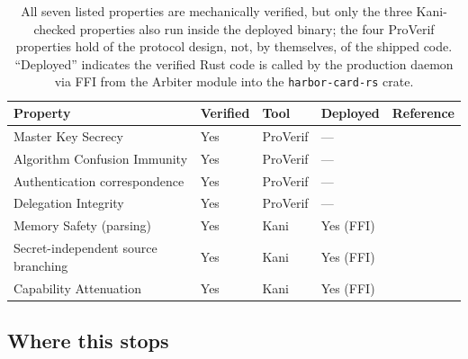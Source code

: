 \documentclass[11pt,a4paper]{article}
\theoremstyle{definition}
\begin{document}
\begin{table}[H]
\centering
\caption{All seven listed properties are mechanically verified, but only the three Kani-checked properties also run inside the deployed binary; the four ProVerif properties hold of the protocol design, not, by themselves, of the shipped code. ``Deployed'' indicates the verified Rust code is called by the production daemon via FFI from the Arbiter module into the \texttt{harbor-card-rs} crate.}
\label{tab:properties}
\begin{tabular}{@{}lllll@{}}
\toprule
\textbf{Property} & \textbf{Verified} & \textbf{Tool} & \textbf{Deployed} & \textbf{Reference} \\
\midrule
Master Key Secrecy & Yes & ProVerif & --- & \cite{blanchet2016modeling} \\
Algorithm Confusion Immunity & Yes & ProVerif & --- & \cite{mclean2015critical} \\
Authentication correspondence & Yes & ProVerif & --- & \cite{lowe1997hierarchy} \\
Delegation Integrity & Yes & ProVerif & --- & \cite{birgisson2014macaroons} \\
Memory Safety (parsing) & Yes & Kani & Yes (FFI) & \cite{aws2022kani} \\
Secret-independent source branching & Yes & Kani & Yes (FFI) & \cite{brumley2011remote} \\
Capability Attenuation & Yes & Kani & Yes (FFI) & \cite{birgisson2014macaroons} \\
\bottomrule
\end{tabular}
\end{table}

\subsection{Where this stops}\label{sec:limitations}
\end{document}

